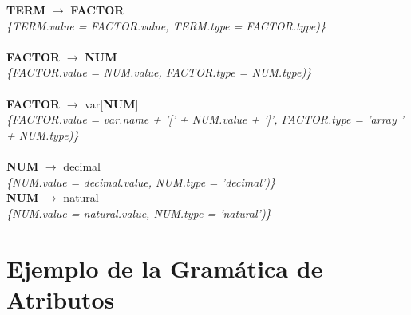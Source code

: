 \documentclass[10pt,a4paper]{article}
\begin{document}
\textbf{TERM} $\rightarrow$ \textbf{FACTOR} \\

\textit{\{TERM.value = FACTOR.value, TERM.type = FACTOR.type)\}}  \\ \\


\textbf{FACTOR} $\rightarrow$ \textbf{NUM}   \\

\textit{\{FACTOR.value = NUM.value, FACTOR.type = NUM.type)\}}  \\ \\


\textbf{FACTOR} $\rightarrow$ var[\textbf{NUM}]  \\ 

\textit{\{FACTOR.value = var.name + '[' + NUM.value + ']', FACTOR.type = 'array ' + NUM.type)\}}  \\ 
\\

\textbf{NUM} $\rightarrow$ decimal \\

\textit{\{NUM.value = decimal.value, NUM.type = 'decimal')\}}  \\ 

\textbf{NUM} $\rightarrow$ natural \\

\textit{\{NUM.value = natural.value, NUM.type = 'natural')\}}  \\ 


\section{Ejemplo de la Gramática de Atributos}
\end{document}
